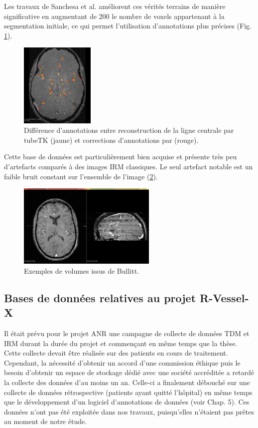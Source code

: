 Les travaux de Sanchesa et al. \cite{Sanchesa2019_annotations_deep} améliorent ces vérités terrains de manière significative en augmentant de 200 \percent le nombre de voxels appartenant à la segmentation initiale, ce qui permet l'utilisation d'annotations plus précises (Fig.  \ref{fig:Bullitt_annotation_ameliorations}).

\begin{figure}
    \centering
    \includegraphics[height=4cm]{Images/Bullitt_annotation_ameliorations.png}
    \caption{Différence d'annotations entre reconstruction de la ligne centrale par tubeTK (jaune) et corrections d'annotations par (rouge). }
    \label{fig:Bullitt_annotation_ameliorations}
\end{figure}

Cette base de données est particulièrement bien acquise et présente très peu d'artefacts comparés à des images IRM classiques. Le seul artefact notable est un faible bruit constant sur l'ensemble de l'image (\ref{fig:Bullitt_example}).

\begin{figure}
    \centering
    \includegraphics[height=4cm]{Images/Bullitt_examples.png}
    \caption{Exemples de volumes issus de Bullitt.}
    \label{fig:Bullitt_example}
\end{figure}


\subsection{Bases de données relatives au projet R-Vessel-X}

Il était prévu pour le projet ANR une campagne de collecte de données TDM et IRM durant la durée du projet et commençant en même temps que la thèse. Cette collecte devait être réalisée sur des patients en cours de traitement. Cependant, la nécessité d'obtenir un accord d'une commission éthique puis le besoin d'obtenir un espace de stockage dédié avec une société accréditée a retardé la collecte des données d'au moins un an. Celle-ci a finalement débouché sur une collecte de données rétrospective (patients ayant quitté l'hôpital) en même temps que le développement d'un logiciel d'annotations de données (voir Chap. 5). Ces données n'ont pas été exploitée dans nos travaux, puisqu’elles n’étaient pas prêtes au moment de notre étude.


